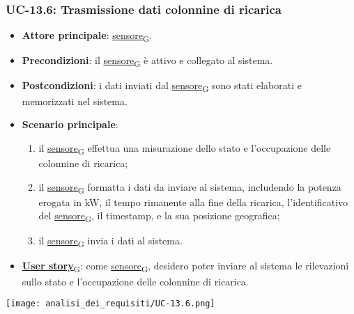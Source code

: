 \subsubsection{UC-13.6: Trasmissione dati colonnine di ricarica}
\begin{itemize}
	\item \textbf{Attore principale}: \href{https://7last.github.io/docs/pb/documentazione-interna/glossario\#sensore}{sensore\textsubscript{G}}.
	\item \textbf{Precondizioni}: il \href{https://7last.github.io/docs/pb/documentazione-interna/glossario\#sensore}{sensore\textsubscript{G}} è attivo e collegato al sistema.
	\item \textbf{Postcondizioni}: i dati inviati dal \href{https://7last.github.io/docs/pb/documentazione-interna/glossario\#sensore}{sensore\textsubscript{G}} sono stati elaborati e memorizzati nel sistema.
	\item \textbf{Scenario principale}:
	      \begin{enumerate}
		      \item il \href{https://7last.github.io/docs/pb/documentazione-interna/glossario\#sensore}{sensore\textsubscript{G}} effettua una misurazione dello stato e l'occupazione delle colonnine di ricarica;
		      \item il \href{https://7last.github.io/docs/pb/documentazione-interna/glossario\#sensore}{sensore\textsubscript{G}} formatta i dati da inviare al sistema, includendo la potenza erogata in kW, il tempo rimanente alla fine della ricarica, l'identificativo del \href{https://7last.github.io/docs/pb/documentazione-interna/glossario\#sensore}{sensore\textsubscript{G}},
		            il timestamp, e la sua posizione geografica;
		      \item il \href{https://7last.github.io/docs/pb/documentazione-interna/glossario\#sensore}{sensore\textsubscript{G}} invia i dati al sistema.
	      \end{enumerate}
	\item \href{https://7last.github.io/docs/pb/documentazione-interna/glossario\#user-story}{\textbf{User story}\textsubscript{G}}:
	      come \href{https://7last.github.io/docs/pb/documentazione-interna/glossario\#sensore}{sensore\textsubscript{G}}, desidero poter inviare al sistema le rilevazioni sullo stato e l'occupazione delle colonnine di ricarica.
\end{itemize}
\begin{center}
	\texttt{[image: analisi\_dei\_requisiti/UC-13.6.png]}
\end{center}


